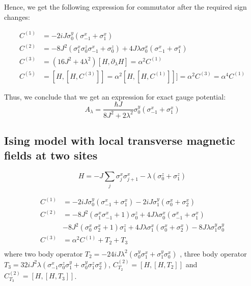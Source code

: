 \documentclass[11pt,a4paper]{article}
\begin{document}
Hence, we get the following  expression for commutator after the required sign changes:


\begin{align*}
C^{(1)}&= -2 i J \sigma_0^y ( \sigma_{-1}^x + \sigma_1^x) \\ 
C^{(2)}&= - 8 J^2(\sigma^x_1 \sigma^z_0 \sigma^x_{-1} + \sigma^z_0) + 4J \lambda \sigma_0^x( \sigma_{-1}^x + \sigma_1^x) \\
C^{(3)} &=  (16 J^2 + 4 \lambda ^2) [H, \partial_{\lambda} H] = \alpha^2  C^{(1)} \\
C^{(5)}&=[H,[H, C^{(3)}]]  = \alpha^2 [H, [H,C^{(1)}]]]=\alpha^2 C^{(3)}=  \alpha^4 C^{(1)}   
\end{align*}

Thus, we conclude that we get an expression for exact gauge potential:
\begin{equation}
\boxed{ A_{\lambda} = \dfrac{\hbar J}{{8 J^2 + 2 \lambda ^2 }} \sigma_0^y ( \sigma_{-1}^x + \sigma_1^x)}
\end{equation}

\subsection{Ising model with local transverse magnetic fields at two sites}


\begin{equation}
H= -J \sum_{j}  \sigma_j^x \sigma_{j+1}^x -  \lambda  (\sigma_0^z+ \sigma_1^z) 
\label{xx2}
\end{equation}

\begin{align*}
C^{(1)}&= -2 i J \sigma_0^y ( \sigma_{-1}^x + \sigma_1^x)  -2 i J \sigma_1^y ( \sigma_{0}^x + \sigma_2^x) \\ 
C^{(2)}&= - 8 J^2(\sigma^x_1 \sigma^x_{-1} +1) \sigma^z_0 + 4J \lambda \sigma_0^x( \sigma_{-1}^x + \sigma_1^x) \\
& - 8 J^2(\sigma^x_0 \ \sigma^x_{2}+1)  \sigma^z_1 + 4J \lambda \sigma_1^x( \sigma_{0}^x + \sigma_2^x)- 8 J \lambda \sigma_1^y \sigma_0^y\\
C^{(3)} &=   \alpha^2  C^{(1)}  +T_2  +T_3\\  %
\end{align*}
where two body operator $T_2=-24 i J \lambda^2 (\sigma^y_{0} \sigma^x_1+ \sigma^y_{1} \sigma^x_0)$  , three body operator $T_3= 32i J^2 \lambda (\sigma^x_{-1} \sigma^z_0 \sigma^y_1   + \sigma^y_{0} \sigma^z_1 \sigma^x_2)$, $C^{(2)}_{T_2}=[H, [H, T_2]]$ and  $C^{(2)}_{T_3}=[H, [H, T_3]]$.
\end{document}
